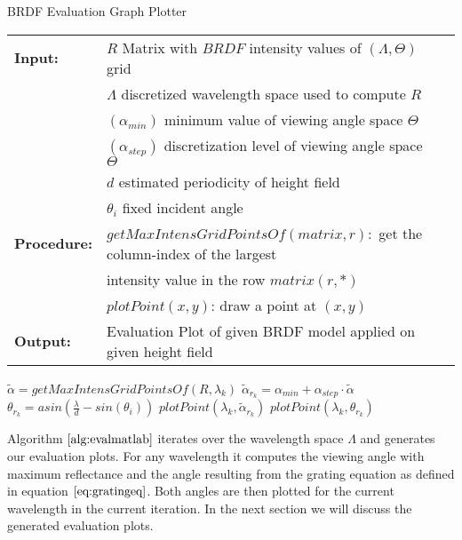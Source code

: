 \begin{algorithm}[H]
\caption{BRDF Evaluation Graph Plotter}
\begin{table}[H]
  \begin{tabular}{@{}lll@{}}
    \textbf{Input:} & $R$ Matrix with $BRDF$ intensity values of $(\Lambda, \Theta)$ grid \\
    & $\Lambda$ discretized wavelength space used to compute $R$ \\
    & $(\alpha_{min})$ minimum value of viewing angle space $\Theta$ \\
    & $(\alpha_{step})$ discretization level of viewing angle space $\Theta$ \\
    & $d$ estimated periodicity of height field \\
    & $\theta_i$ fixed incident angle \\
    \textbf{Procedure:} & $getMaxIntensGridPointsOf(matrix,r):$ get the column-index of the largest  \\
    & \quad \quad \quad \quad \quad \quad \quad \quad \quad \quad \quad \quad \quad \quad \quad \quad \quad \quad intensity value in the row $matrix(r,*)$\\
    &$plotPoint(x,y)$: draw a point at $(x,y)$ \\
    \textbf{Output:} & Evaluation Plot of given BRDF model applied on given height field \\
  \end{tabular} 
\end{table}
\setlength{\fboxrule}{0pt} 
\begin{boxedminipage}{1.0\textwidth}
  \begin{algorithmic}[1]
      \State $\widetilde{\alpha} = getMaxIntensGridPointsOf(R, \lambda_k)$
      \State $\widetilde{\alpha}_{r_k} = \alpha_{min} + \alpha_{step} \cdot \widetilde{\alpha}$
      \State $\theta_{r_k} = asin\left( \frac{\lambda}{d} - sin(\theta_i) \right)$
      \State $plotPoint(\lambda_k, \widetilde{\alpha}_{r_k})$
      \State $plotPoint(\lambda_k, \theta_{r_k})$
    \EndFor
  \end{algorithmic}
  \end{boxedminipage}
  \vskip1.5pt
\label{alg:evalmatlab}
\end{algorithm}

Algorithm $\ref{alg:evalmatlab}$ iterates over the wavelength space $\Lambda$ and generates our evaluation plots. For any wavelength it computes the viewing angle with maximum reflectance and the angle resulting from the grating equation as defined in equation $\ref{eq:gratingeq}$. Both angles are then plotted for the current wavelength in the current iteration. In the next section we will discuss the generated evaluation plots.

